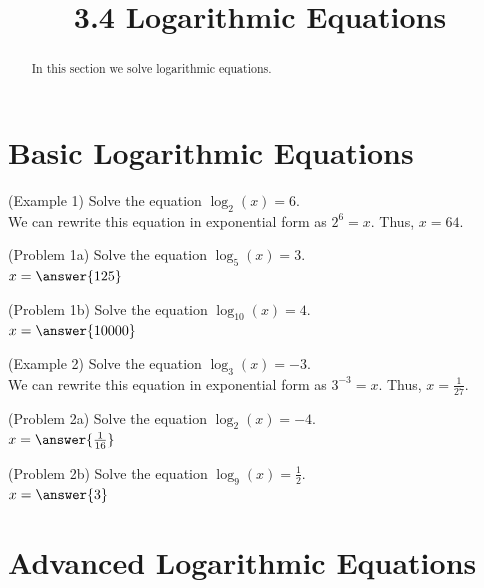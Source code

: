 \documentclass[handout]{ximera}
\title{3.4 Logarithmic Equations}
\begin{document}
\begin{abstract}
In this section we solve logarithmic equations.
\end{abstract}

\maketitle


\section{Basic Logarithmic Equations}
\begin{example}(Example 1)
Solve the equation $\log_2(x) = 6$.\\
We can rewrite this equation in exponential form as $2^6 = x$.
Thus, $x = 64$. 
\end{example}

\begin{problem}(Problem 1a)
Solve the equation $\log_5(x) = 3$.\\
$x = \answer{125}$
\end{problem}

\begin{problem}(Problem 1b)
Solve the equation $\log_{10}(x) = 4$.\\
$x = \answer{10000}$
\end{problem}

\begin{example}(Example 2)
Solve the equation $\log_3(x) = -3$.\\
    We can rewrite this equation in exponential form as $3^{-3} = x$.
    Thus, $x = \frac{1}{27} $.
\end{example}

\begin{problem}(Problem 2a)
Solve the equation $\log_2(x) = -4$.\\
$x = \answer{\frac{1}{16}}$
\end{problem}

\begin{problem}(Problem 2b)
Solve the equation $\log_9(x) = \frac{1}{2}$.\\
$x = \answer{3}$
\end{problem}



\section{Advanced Logarithmic Equations}
\end{document}
